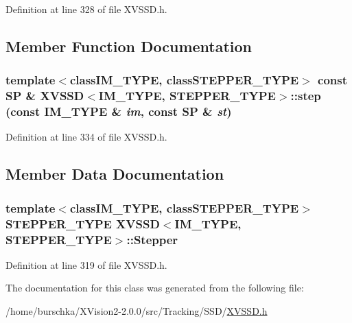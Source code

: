 Definition at line 328 of file XVSSD.h.

\subsection{Member Function Documentation}
\label{XVSSD_a4}
\hypertarget{class_XVSSD_a4}{
\subsubsection[step]{\setlength{\rightskip}{0pt plus 5cm}template$<$classIM\_\-TYPE, classSTEPPER\_\-TYPE$>$ const SP \& XVSSD$<$IM\_\-TYPE, STEPPER\_\-TYPE$>$::step (const IM\_\-TYPE \& {\em im}, const SP \& {\em st})}}




Definition at line 334 of file XVSSD.h.

\subsection{Member Data Documentation}
\label{XVSSD_n0}
\hypertarget{class_XVSSD_n0}{
\subsubsection[Stepper]{\setlength{\rightskip}{0pt plus 5cm}template$<$classIM\_\-TYPE, classSTEPPER\_\-TYPE$>$ STEPPER\_\-TYPE XVSSD$<$IM\_\-TYPE, STEPPER\_\-TYPE$>$::Stepper}}




Definition at line 319 of file XVSSD.h.

The documentation for this class was generated from the following file:\begin{CompactItemize}
\item 
/home/burschka/XVision2-2.0.0/src/Tracking/SSD/\hyperlink{XVSSD.h-source}{XVSSD.h}\end{CompactItemize}

